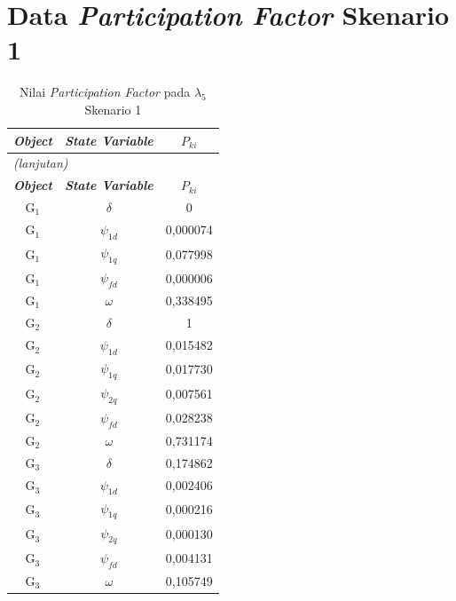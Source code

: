 \section{Data \textit{Participation Factor} Skenario 1}

\begingroup
\fontsize{12}{14.4}\selectfont
\setlength{\tabcolsep}{8pt}
\begin{longtable}{c c c} \caption[]{Nilai
	\textit{Participation Factor} pada $\lambda_5$ Skenario 1}
	\label{tab:prf_sk1_lampiran} \\
	\toprule
	\multicolumn{1}{c}{\textbf{\textit{Object}}} & \textbf{\textit{State
	Variable}} & \textbf{$P_{ki}$} \\
	\midrule
	\endfirsthead
	\multicolumn{3}{l}{\textit{(lanjutan)}} \\
	\toprule
	\multicolumn{1}{c}{\textbf{\textit{Object}}} & \textbf{\textit{State
	Variable}} & \textbf{$P_{ki}$} \\
	\midrule
	\endhead
	\bottomrule
	\endfoot
	G$_1$ & $\delta$    & 0          \\
	G$_1$ & $\psi_{1d}$  & 0,000074   \\
	G$_1$ & $\psi_{1q}$  & 0,077998   \\
	G$_1$ & $\psi_{fd}$  & 0,000006   \\
	G$_1$ & $\omega$  & 0,338495   \\
	G$_2$ & $\delta$    & 1          \\
	G$_2$ & $\psi_{1d}$  & 0,015482   \\
	G$_2$ & $\psi_{1q}$  & 0,017730   \\
	G$_2$ & $\psi_{2q}$  & 0,007561   \\
	G$_2$ & $\psi_{fd}$  & 0,028238   \\
	G$_2$ & $\omega$  & 0,731174   \\
	G$_3$ & $\delta$    & 0,174862   \\
	G$_3$ & $\psi_{1d}$  & 0,002406   \\
	G$_3$ & $\psi_{1q}$  & 0,000216   \\
	G$_3$ & $\psi_{2q}$  & 0,000130   \\
	G$_3$ & $\psi_{fd}$  & 0,004131   \\
	G$_3$ & $\omega$  & 0,105749   \\
\end{longtable}
\par
\endgroup

